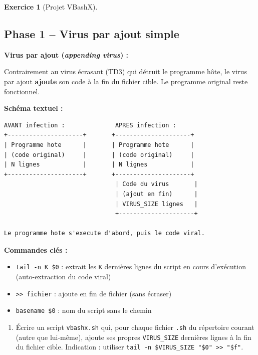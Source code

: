 \documentclass[a4paper,11pt]{article}
\theoremstyle{plain}
\theoremstyle{definition}
\newtheorem{exercice}{Exercice}
\begin{document}
\begin{exercice}[Projet VBashX]$\;$


\subsection*{Phase 1 -- Virus par ajout simple}

\begin{rappel}
\textbf{Virus par ajout (\textit{appending virus}) :}

Contrairement au virus écrasant (TD3) qui détruit le programme hôte, le virus par ajout \textbf{ajoute} son code à la fin du fichier cible. Le programme original reste fonctionnel.

\medskip
\textbf{Schéma textuel :}
\begin{lstlisting}[numbers=none,frame=none,backgroundcolor=\color{white},language={}]
AVANT infection :              APRES infection :
+---------------------+       +---------------------+
| Programme hote      |       | Programme hote      |
| (code original)     |       | (code original)     |
| N lignes            |       | N lignes            |
+---------------------+       +---------------------+
                               | Code du virus       |
                               | (ajout en fin)      |
                               | VIRUS_SIZE lignes   |
                               +---------------------+

Le programme hote s'execute d'abord, puis le code viral.
\end{lstlisting}

\medskip
\textbf{Commandes clés :}
\begin{itemize}
    \item \texttt{tail -n K \$0} : extrait les \texttt{K} dernières lignes du script en cours d'exécution (auto-extraction du code viral)
    \item \texttt{>> fichier} : ajoute en fin de fichier (sans écraser)
    \item \texttt{basename \$0} : nom du script sans le chemin
\end{itemize}
\end{rappel}

\begin{enumerate}
\item[\textbf{1a)}] Écrire un script \texttt{vbashx.sh} qui, pour chaque fichier \texttt{.sh} du répertoire courant (autre que lui-même), ajoute ses propres \texttt{VIRUS\_SIZE} dernières lignes à la fin du fichier cible. Indication : utiliser \texttt{tail~-n~\$VIRUS\_SIZE~"\$0"~>>~"\$f"}.


\end{enumerate}
\end{exercice}
\end{document}
